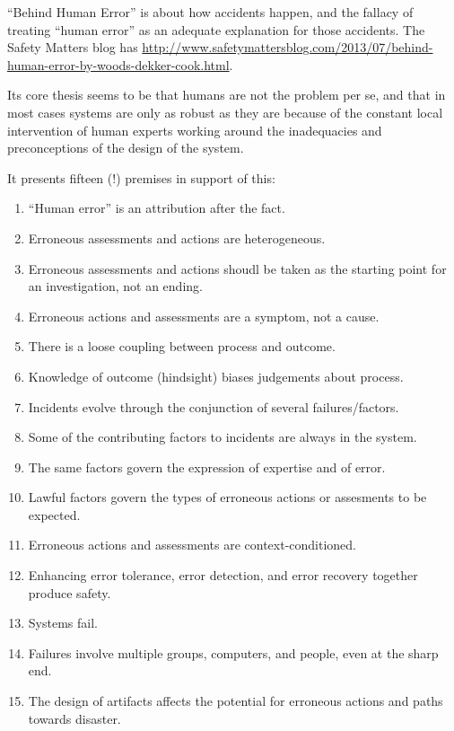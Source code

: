 ``Behind Human Error'' is about how accidents happen,
and the fallacy of treating ``human error'' as an adequate explanation for those accidents.
The Safety Matters blog has \href{a good review of this book}{http://www.safetymattersblog.com/2013/07/behind-human-error-by-woods-dekker-cook.html}.

Its core thesis seems to be that humans are not the problem per se,
and that in most cases systems are only as robust as they are because of the constant local intervention of human experts working around the inadequacies and preconceptions of the design of the system.

It presents fifteen (!) premises in support of this:

\begin{enumerate}
\item ``Human error'' is an attribution after the fact.
\item Erroneous assessments and actions are heterogeneous.
\item Erroneous assessments and actions shoudl be taken as the starting point for an investigation, not an ending.
\item Erroneous actions and assessments are a symptom, not a cause.
\item There is a loose coupling between process and outcome.
\item Knowledge of outcome (hindsight) biases judgements about process.
\item Incidents evolve through the conjunction of several failures/factors.
\item Some of the contributing factors to incidents are always in the system.
\item The same factors govern the expression of expertise and of error.
\item Lawful factors govern the types of erroneous actions or assesments to be expected.
\item Erroneous actions and assessments are context-conditioned.
\item Enhancing error tolerance, error detection, and error recovery together produce safety.
\item Systems fail.
\item Failures involve multiple groups, computers, and people, even at the sharp end.
\item The design of artifacts affects the potential for erroneous actions and paths towards disaster.
\end{enumerate}

